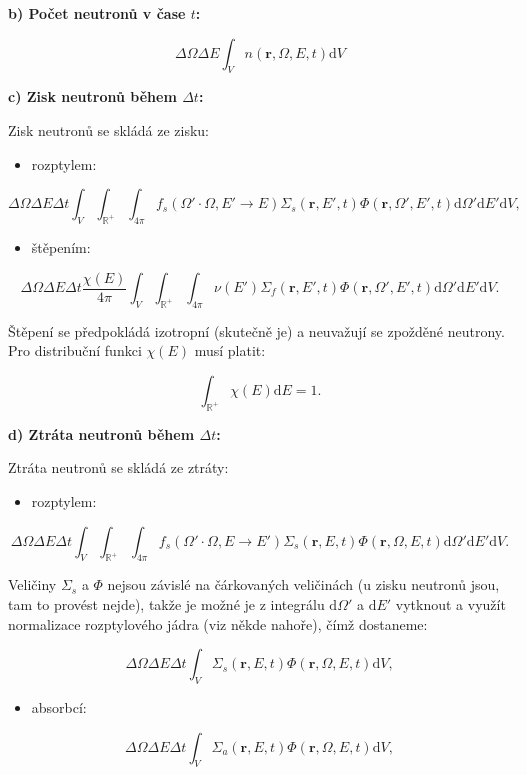 \textbf{b) Počet neutronů v čase $t$:}

$$ \Delta \Omega \Delta E \int_V n(\textbf{r}, \Omega, E, t) \text{d}V $$

\textbf{c) Zisk neutronů během $\Delta t$:}

Zisk neutronů se skládá ze zisku:

\begin{itemize}
  \item rozptylem:
\end{itemize}
$$ \Delta \Omega \Delta E \Delta t \int_V \int_\mathbb{R^+} \int_{4 \pi} f_s(\Omega' \cdot \Omega, E' \rightarrow E) \Sigma_s(\textbf{r}, E', t) \Phi(\textbf{r}, \Omega', E', t) \text{d}\Omega' \text{d}E' \text{d}V, $$

\begin{itemize}
  \item štěpením:
\end{itemize}
$$ \Delta \Omega \Delta E \Delta t \dfrac{\chi(E)}{4 \pi} \int_V \int_\mathbb{R^+} \int_{4 \pi} \nu(E') \Sigma_f(\textbf{r}, E', t) \Phi(\textbf{r}, \Omega', E', t) \text{d}\Omega' \text{d}E' \text{d}V. $$


Štěpení se předpokládá izotropní (skutečně je) a neuvažují se zpožděné neutrony. Pro distribuční funkci $\chi(E)$ musí platit:

$$ \int_\mathbb{R^+} \chi(E) \text{d} E = 1. $$

\textbf{d) Ztráta neutronů během $\Delta t$:}

Ztráta neutronů se skládá ze ztráty:

\begin{itemize}
  \item rozptylem:
\end{itemize}
$$ \Delta \Omega \Delta E \Delta t \int_V \int_\mathbb{R^+} \int_{4 \pi} f_s(\Omega' \cdot \Omega, E \rightarrow E') \Sigma_s(\textbf{r}, E, t) \Phi(\textbf{r}, \Omega, E, t) \text{d}\Omega' \text{d}E' \text{d}V. $$

Veličiny $\Sigma_s$ a $\Phi$ nejsou závislé na čárkovaných veličinách (u zisku neutronů jsou, tam to provést nejde), takže je možné je z integrálu $\text{d}\Omega'$ a $\text{d}E'$ vytknout a využít normalizace rozptylového jádra (viz někde nahoře), čímž dostaneme:

$$ \Delta \Omega \Delta E \Delta t \int_V  \Sigma_s(\textbf{r}, E, t) \Phi(\textbf{r}, \Omega, E, t) \text{d}V, $$

\begin{itemize}
  \item absorbcí:
\end{itemize}
$$ \Delta \Omega \Delta E \Delta t \int_V  \Sigma_a(\textbf{r}, E, t) \Phi(\textbf{r}, \Omega, E, t) \text{d}V, $$

